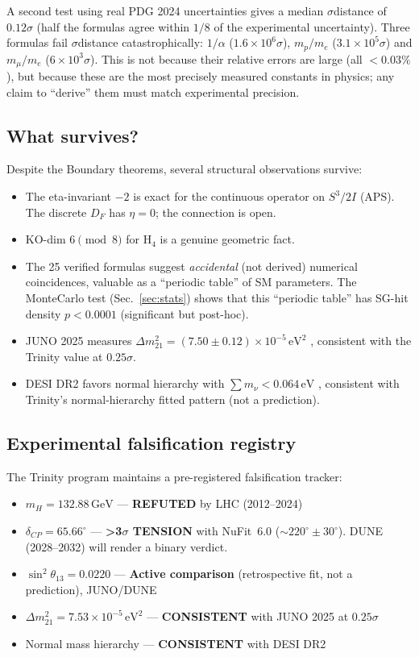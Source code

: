 \documentclass[11pt,a4paper]{article}
\theoremstyle{definition}
\begin{document}
A second test using real PDG 2024 uncertainties gives a median
$\sigma$\-distance of $0.12\sigma$ (half the formulas agree within
$1/8$ of the experimental uncertainty).  Three formulas fail
$\sigma$\-distance catastrophically: $1/\alpha$ ($1.6\times10^6\sigma$),
$m_p/m_e$ ($3.1\times10^5\sigma$) and $m_\mu/m_e$ ($6\times10^3\sigma$).
This is not because their relative errors are large (all $<0.03\%$),
but because these are the most precisely measured constants in physics;
any claim to ``derive'' them must match experimental precision.

\subsection{What survives?}

Despite the Boundary theorems, several structural observations survive:
\begin{itemize}
  \item The eta-invariant $-2$ is exact for the continuous operator on $S^3/2I$ (APS). The discrete $D_F$ has $\eta=0$; the connection is open.
  \item KO-dim $6 \pmod 8$ for H$_4$ is a genuine geometric fact.
  \item The 25 verified formulas suggest \emph{accidental} (not derived)
    numerical coincidences, valuable as a ``periodic table'' of SM
    parameters.  The Monte\-Carlo test (Sec.~\ref{sec:stats}) shows
    that this ``periodic table'' has SG-hit density $p < 0.0001$ (significant but post-hoc).
  \item JUNO 2025 measures $\Delta m^2_{21} = (7.50 \pm 0.12) \times 10^{-5}\,\text{eV}^2$
    \cite{JUNO:2025}, consistent with the Trinity value at $0.25\sigma$.
  \item DESI DR2 favors normal hierarchy with $\sum m_\nu < 0.064\,\text{eV}$
    \cite{DESI:2025}, consistent with Trinity's normal-hierarchy fitted pattern (not a prediction).
\end{itemize}

\subsection{Experimental falsification registry}

The Trinity program maintains a pre-registered falsification tracker:
\begin{itemize}
  \item $m_H = 132.88\,\text{GeV}$ --- \textbf{REFUTED} by LHC (2012--2024)
  \item $\delta_{CP} = 65.66^\circ$ --- \textbf{>3$\sigma$ TENSION} with
    NuFit~6.0 ($\sim$$220^\circ \pm 30^\circ$). DUNE (2028--2032) will
    render a binary verdict.
  \item $\sin^2\theta_{13} = 0.0220$ --- \textbf{Active comparison} (retrospective fit, not a prediction), JUNO/DUNE
  \item $\Delta m^2_{21} = 7.53 \times 10^{-5}\,\text{eV}^2$ ---
    \textbf{CONSISTENT} with JUNO 2025 at $0.25\sigma$
  \item Normal mass hierarchy --- \textbf{CONSISTENT} with DESI DR2
\end{itemize}
\end{document}
